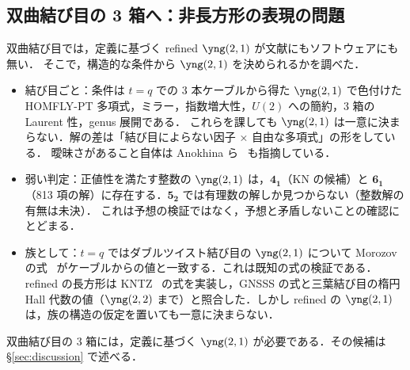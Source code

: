 \subsection{双曲結び目の 3 箱へ：非長方形の表現の問題}\label{sec:21}
双曲結び目では，定義に基づく refined $\yng(2,1)$ が文献にもソフトウェアにも無い．
そこで，構造的な条件から $\yng(2,1)$ を決められるかを調べた．
\begin{itemize}
\item 結び目ごと：条件は $t=q$ での 3 本ケーブルから得た $\yng(2,1)$ で色付けた HOMFLY-PT 多項式，ミラー，指数増大性，$U(2)$ への簡約，3 箱の Laurent 性，genus 展開である．
これらを課しても $\yng(2,1)$ は一意に決まらない．解の差は「結び目によらない因子 × 自由な多項式」の形をしている．
曖昧さがあること自体は Anokhina ら~\cite{Anokhina12} も指摘している．
\item 弱い判定：正値性を満たす整数の $\yng(2,1)$ は，$\mathbf{4_1}$（KN の候補）と $\mathbf{6_1}$（813 項の解）に存在する．$\mathbf{5_2}$ では有理数の解しか見つからない（整数解の有無は未決）．
これは予想の検証ではなく，予想と矛盾しないことの確認にとどまる．
\item 族として：$t=q$ ではダブルツイスト結び目の $\yng(2,1)$ について Morozov の式~\cite{Morozov16,Morozov19} がケーブルからの値と一致する．これは既知の式の検証である．
refined の長方形は KNTZ~\cite{Kameyama19} の式を実装し，GNSSS の式と三葉結び目の楕円 Hall 代数の値（$\yng(2,2)$ まで）と照合した．しかし refined の $\yng(2,1)$ は，族の構造の仮定を置いても一意に決まらない．
\end{itemize}
双曲結び目の 3 箱には，定義に基づく $\yng(2,1)$ が必要である．その候補は \S\ref{sec:discussion} で述べる．
